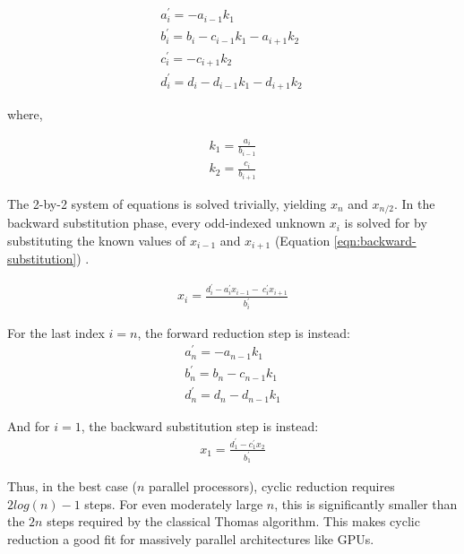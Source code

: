 \documentclass{elsarticle}
\begin{document}
\begin{align} 
& a^{\prime}_i = -a_{i-1}k_1 \
    \label{eqn:forward-reduction-1}& \\
& b^{\prime}_i = b_i - c_{i-1}k_1 - a_{i+1}k_2 \
    \label{eqn:forward-reduction-2}& \\
& c^{\prime}_i = -c_{i+1}k_2 \
    \label{eqn:forward-reduction-3}& \\
& d^{\prime}_i = d_i - d_{i-1}k_1  - d_{i+1}k_2 \
    \label{eqn:forward-reduction-4}&
\end{align}

where,

\begin{align}
& k_1 = \frac{a_i}{b_{i-1}} \label{eqn:k1-update}& \\
& k_2 = \frac{c_i}{b_{i+1}} \label{eqn:k2-update}&
\end{align}

The 2-by-2 system of equations is solved trivially,
yielding $x_n$ and $x_{n/2}$.
In the backward substitution phase,
every odd-indexed unknown $x_i$ is solved for by
substituting the known values of $x_{i-1}$ and $x_{i+1}$
(Equation \ref{eqn:backward-substitution}) .

\begin{align} \label{eqn:backward-substitution}
x_i = \frac{d^{\prime}_i - a^{\prime}_ix_{i-1} - \
    c^{\prime}_ix_{i+1}}{b^{\prime}_i}
\end{align}

For the last index $i=n$,
the forward reduction step is instead:
\begin{align} \label{eqn:forward-reduction-last}
    & a^{\prime}_n = -a_{n-1}k_1 & \\
    & b^{\prime}_n = b_n - c_{n-1}k_1 & \\
    & d^{\prime}_n = d_n - d_{n-1}k_1&
\end{align}

And for $i=1$, the backward substitution step is instead:
\begin{align} \label{eqn:backward-substitution-first}
x_1 = \frac{d^{\prime}_1 - c^{\prime}_1x_{2}}{b^{\prime}_1}
\end{align}

Thus, in the best case ($n$ parallel processors),
cyclic reduction requires 
$2log(n) - 1$ steps.
For even moderately large $n$,
this is significantly smaller than
the $2n$ steps required by the classical Thomas algorithm.
This makes cyclic reduction a good fit
for massively parallel architectures like GPUs.
\end{document}
